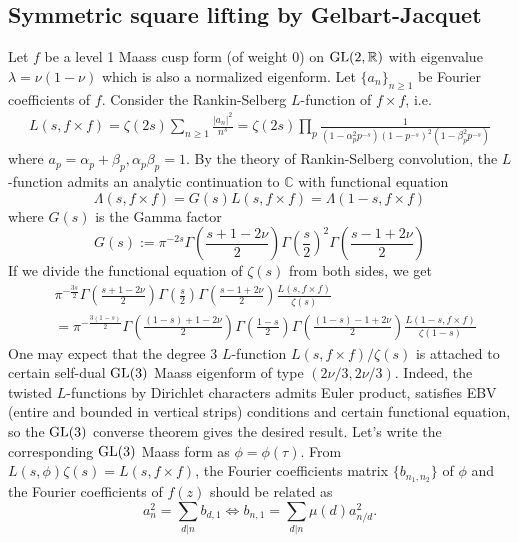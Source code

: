 \subsection{Symmetric square lifting by Gelbart-Jacquet}

Let $f$ be a level 1 Maass cusp form (of weight 0) on $\operatorname{\mathrm{GL}}(2,\mathbb{R})$ with eigenvalue $\lambda = \nu(1-\nu)$ which is also a normalized eigenform.
Let $\{a_{n}\}_{n\geq 1}$ be Fourier coefficients of $f$.
Consider the Rankin-Selberg $L$-function of $f \times f$, i.e.
\begin{align*}
L(s, f \times f) = \zeta(2s)\sum_{n\geq 1} \frac{|a_{n}|^{2}}{n^{s}}
= \zeta(2s)\prod_{p}  \frac{1}{(1-\alpha_{p}^{2}p^{-s})(1-p^{-s})^{2}(1-\beta_{p}^{2}p^{-s})}
\end{align*}
where $a_{p} = \alpha_{p} + \beta_{p}, \alpha_{p}\beta_{p} =1$.
By the theory of Rankin-Selberg convolution, the $L$-function admits an analytic continuation to $\mathbb{C}$ with functional equation
$$
\Lambda(s, f \times f) = G(s)L(s, f\times f) = \Lambda(1-s, f\times f)
$$
where $G(s)$ is the Gamma factor
$$
G(s) := \pi^{-2s}\Gamma\left(\frac{s + 1 - 2\nu}{2}\right)\Gamma\left(\frac{s}{2}\right)^{2} \Gamma\left(\frac{s - 1 + 2\nu}{2}\right)
$$
If we divide the functional equation of $\zeta(s)$ from both sides, we get
\begin{align*}
    &\pi^{-\frac{3s}{2}} \Gamma\left(\frac{s + 1 - 2\nu}{2}\right)\Gamma\left(\frac{s}{2}\right) \Gamma\left(\frac{s - 1 + 2\nu}{2}\right) \frac{L(s, f\times f)}{\zeta(s)} \\
    &=\pi^{-\frac{3(1-s)}{2}} \Gamma\left(\frac{(1-s) + 1 - 2\nu}{2}\right)\Gamma\left(\frac{1-s}{2}\right) \Gamma\left(\frac{(1-s) - 1 + 2\nu}{2}\right) \frac{L(1-s, f\times f)}{\zeta(1-s)}
\end{align*}
One may expect that the degree 3 $L$-function $L(s, f\times f) / \zeta(s)$ is attached to certain self-dual $\operatorname{\mathrm{GL}}(3)$ Maass eigenform of type $(2\nu/3, 2\nu/3)$.
Indeed, the twisted $L$-functions by Dirichlet characters admits Euler product, satisfies EBV (entire and bounded in vertical strips) conditions and certain functional equation, so the $\operatorname{\mathrm{GL}}(3)$ converse theorem gives the desired result.
Let's write the corresponding $\operatorname{\mathrm{GL}}(3)$ Maass form as $\phi = \phi(\tau)$.
From $L(s, \phi)\zeta(s) = L(s, f\times f)$, the Fourier coefficients matrix $\{b_{n_{1}, n_{2}}\}$ of $\phi$ and the Fourier coefficients of $f(z)$ should be related as
$$
a_{n}^{2} = \sum_{d|n} b_{d, 1} \Longleftrightarrow b_{n, 1} = \sum_{d|n} \mu(d) a_{n/d}^{2}.
$$


